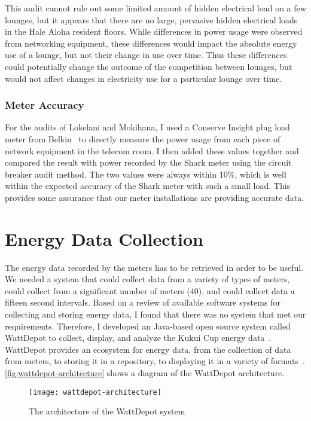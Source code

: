 This audit cannot rule out some limited amount of hidden electrical load on a few lounges, but it appears that there are no large, pervasive hidden electrical loads in the Hale Aloha resident floors. While differences in power usage were observed from networking equipment, these differences would impact the absolute energy use of a lounge, but not their change in use over time. Thus these differences could potentially change the outcome of the competition between lounges, but would not affect changes in electricity use for a particular lounge over time.


\subsubsection{Meter Accuracy}

For the audits of Lokelani and Mokihana, I used a Conserve Insight plug load meter from Belkin~\cite{belkin-insight} to directly measure the power usage from each piece of network equipment in the telecom room. I then added these values together and compared the result with power recorded by the Shark meter using the circuit breaker audit method. The two values were always within 10\%, which is well within the expected accuracy of the Shark meter with such a small load. This provides some assurance that our meter installations are providing accurate data.


\section{Energy Data Collection}
\label{sec:energy-data-collection}

The energy data recorded by the meters has to be retrieved in order to be useful. We needed a system that could collect data from a variety of types of meters, could collect from a significant number of meters (40), and could collect data a fifteen second intervals. Based on a review of available software systems for collecting and storing energy data, I found that there was no system that met our requirements. Therefore, I developed an Java-based open source system called WattDepot to collect, display, and analyze the Kukui Cup energy data~\cite{csdl2-10-05}. WattDepot provides an ecosystem for energy data, from the collection of data from meters, to storing it in a repository, to displaying it in a variety of formats~\cite{WattDepot}. \autoref{fig:wattdepot-architecture} shows a diagram of the WattDepot architecture.

\begin{figure}[htbp]
	\centering
		\texttt{[image: wattdepot-architecture]}
		\caption{The architecture of the WattDepot system}
\label{fig:wattdepot-architecture}
\end{figure}

